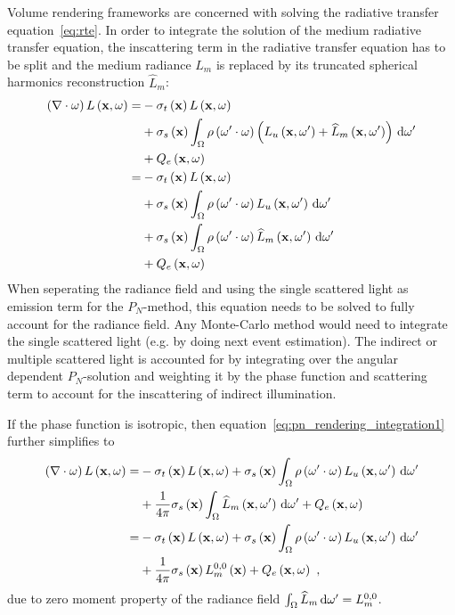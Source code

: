 Volume rendering frameworks are concerned with solving the radiative transfer equation~\ref{eq:rte}. In order to integrate the solution of the medium radiative transfer equation, the inscattering term in the radiative transfer equation has to be split and the medium radiance $L_m$ is replaced by its truncated spherical harmonics reconstruction $\widehat{L}_m$:
\begin{align}
\left(\nabla\cdot\omega\right)L\left(\mathbf{x}, \omega \right)
=&
-\sigma_t\left(\mathbf{x}\right) L\left(\mathbf{x}, \omega \right)\nonumber\\
&
+\sigma_s\left(\mathbf{x}\right) \int_{\Omega}
{
\rho\left(\omega'\cdot\omega\right)\left(L_u\left(\mathbf{x}, \omega' \right)+\widehat{L}_m\left(\mathbf{x}, \omega' \right)\right)\,\mathrm{d}\omega'
}
\nonumber
\\
&
+Q_e\left(\mathbf{x}, \omega\right)
\nonumber
\\
=&
-\sigma_t\left(\mathbf{x}\right) L\left(\mathbf{x}, \omega \right)
\nonumber\\
&
+\sigma_s\left(\mathbf{x}\right) \int_{\Omega}
{
\rho\left(\omega'\cdot\omega\right)L_u\left(\mathbf{x}, \omega' \right)\,\mathrm{d}\omega'
}
\nonumber\\
&
+\sigma_s\left(\mathbf{x}\right) \int_{\Omega}
{
\rho\left(\omega'\cdot\omega\right)\widehat{L}_m\left(\mathbf{x}, \omega' \right)\,\mathrm{d}\omega'
}
\nonumber\\
&
+Q_e\left(\mathbf{x}, \omega\right)
\label{eq:pn_rendering_integration1}
\end{align}
When seperating the radiance field and using the single scattered light as emission term for the $P_N$-method, this equation needs to be solved to fully account for the radiance field. Any Monte-Carlo method would need to integrate the single scattered light (e.g. by doing next event estimation). The indirect or multiple scattered light is accounted for by integrating over the angular dependent $P_N$-solution and weighting it by the phase function and scattering term to account for the inscattering of indirect illumination.

If the phase function is isotropic, then equation~\ref{eq:pn_rendering_integration1} further simplifies to
\begin{align}
\left(\nabla\cdot\omega\right)L\left(\mathbf{x}, \omega \right)
=&
-\sigma_t\left(\mathbf{x}\right) L\left(\mathbf{x}, \omega \right)
+\sigma_s\left(\mathbf{x}\right) \int_{\Omega}
{
\rho\left(\omega'\cdot\omega\right)L_u\left(\mathbf{x}, \omega' \right)\,\mathrm{d}\omega'
}
\nonumber\\
&
+
\frac{1}{4\pi}
\sigma_s\left(\mathbf{x}\right)
\int_{\Omega}
{
\widehat{L}_m\left(\mathbf{x}, \omega' \right)\,\mathrm{d}\omega'
}
+Q_e\left(\mathbf{x}, \omega\right)
\nonumber\\
=&
-\sigma_t\left(\mathbf{x}\right) L\left(\mathbf{x}, \omega \right)
+\sigma_s\left(\mathbf{x}\right) \int_{\Omega}
{
\rho\left(\omega'\cdot\omega\right)L_u\left(\mathbf{x}, \omega' \right)\,\mathrm{d}\omega'
}
\nonumber\\
&
+
\frac{1}{4\pi}
\sigma_s\left(\mathbf{x}\right)
L_m^{0,0}\left(\mathbf{x}\right)
+Q_e\left(\mathbf{x}, \omega\right)
\ ,
\label{eq:pn_rendering_integration2}
\end{align}
due to zero moment property of the radiance field $\int_{\Omega}\widehat{L}_m\,\mathrm{d}\omega'=L_m^{0,0}$.

